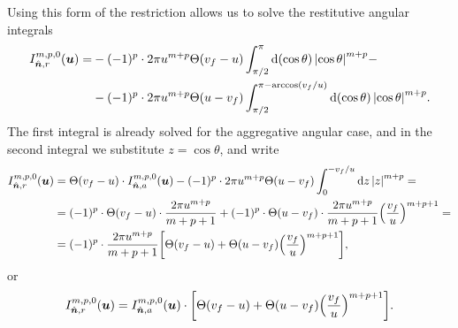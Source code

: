 \documentclass[aps,prl,preprint,groupedaddress,10pt]{revtex4-2}
\begin{document}
Using this form of the restriction allows us to solve the restitutive angular integrals
\begin{equation}
    \begin{split}
        I_{\bn,r}^{m,p,0}(\bu)=&-(-1)^p\cdot 2\pi u^{m+p}\Theta\pqty{v_f-u}
        \int_{\pi/2}^{\pi}\dd{\pqty{\cos\theta}}\abs{\cos\theta}^{m+p}-\\
        &-(-1)^p\cdot 2\pi u^{m+p}\Theta\pqty{u-v_f}
        \int_{\pi/2}^{\pi-\arccos(v_f/u)}\dd{\pqty{\cos\theta}}\abs{\cos\theta}^{m+p}.
    \end{split}
\end{equation}
The first integral is already solved for the aggregative angular case, and in the
second integral we substitute $z=\cos\theta$, and write
\begin{equation}
    \begin{split}
        I_{\bn,r}^{m,p,0}(\bu)&=\Theta\pqty{v_f-u}\cdot I_{\bn,a}^{m,p,0}(\bu)-
        (-1)^p\cdot 2\pi u^{m+p}\Theta\pqty{u-v_f}
        \int_{0}^{-v_f/u}\dd{z}\abs{z}^{m+p}=\\
        &=(-1)^p\cdot\Theta\pqty{v_f-u}\cdot
        \frac{2\pi u^{m+p}}{m+p+1}+
        (-1)^p\cdot \Theta\pqty{u-v_f}\cdot\frac{2\pi u^{m+p}}{m+p+1}
        \pqty{\frac{v_f}{u}}^{m+p+1}=\\
        &=(-1)^p\cdot\frac{2\pi u^{m+p}}{m+p+1}
        \bqty{\Theta\pqty{v_f-u}+\Theta\pqty{u-v_f}
            \pqty{\frac{v_f}{u}}^{m+p+1}},
    \end{split}
\end{equation}
or
\begin{equation}
    I_{\bn,r}^{m,p,0}(\bu)=I_{\bn,a}^{m,p,0}(\bu)\cdot
    \bqty{\Theta\pqty{v_f-u}+\Theta\pqty{u-v_f}\pqty{\frac{v_f}{u}}^{m+p+1}}.
\end{equation}
\end{document}
